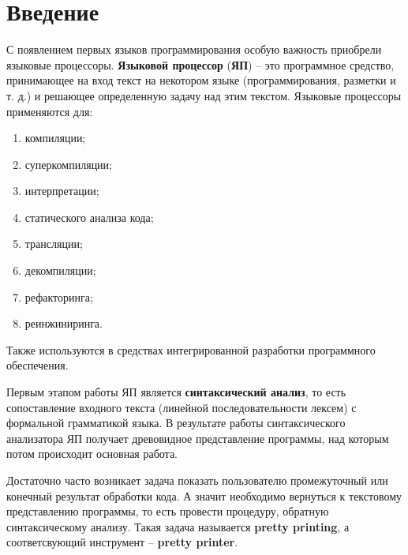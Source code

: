 \section*{Введение}


С появлением первых языков программирования особую важность приобрели языковые процессоры. \textbf{Языковой процессор} (\textbf{ЯП}) -- это программное средство, принимающее на вход текст на некотором языке (программирования, разметки и т. д.) и решающее определенную задачу над этим текстом. Языковые процессоры применяются для:
\begin{enumerate}
\item компиляции;
\item суперкомпиляции;
\item интерпретации;
\item статического анализа кода;
\item трансляции;
\item декомпиляции;
\item рефакторинга;
\item реинжиниринга.
\end{enumerate}
Также используются в средствах интегрированной разработки программного обеспечения. 

Первым этапом работы ЯП является \textbf{синтаксический анализ}, то есть сопоставление входного текста (линейной последовательности лексем) с формальной грамматикой языка. В результате работы синтаксического анализатора ЯП получает древовидное представление программы, над которым потом происходит основная работа.

Достаточно часто возникает задача показать пользователю промежуточный или конечный результат обработки кода.
А значит необходимо вернуться к текстовому представлению программы, то есть провести процедуру, обратную синтаксическому анализу. Такая задача называется \textbf{pretty printing}, а соответсвующий инструмент -- \textbf{pretty printer}.

